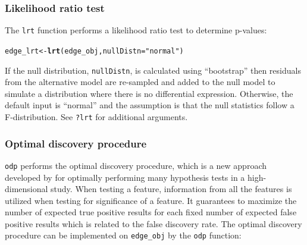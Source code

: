 \documentclass{article}\usepackage[]{graphicx}\usepackage[]{color}
\makeatletter
\newcommand{\hlstr}[1]{\textcolor[rgb]{0.192,0.494,0.8}{#1}}%
\newcommand{\hlstd}[1]{\textcolor[rgb]{0.345,0.345,0.345}{#1}}%
\newcommand{\hlkwb}[1]{\textcolor[rgb]{0.69,0.353,0.396}{#1}}%
\newcommand{\hlkwc}[1]{\textcolor[rgb]{0.333,0.667,0.333}{#1}}%
\newcommand{\hlkwd}[1]{\textcolor[rgb]{0.737,0.353,0.396}{\textbf{#1}}}%
\newenvironment{kframe}{%
 \def\at@end@of@kframe{}%
 \ifinner\ifhmode%
  \def\at@end@of@kframe{\end{minipage}}%
  \begin{minipage}{\columnwidth}%
 \fi\fi%
 \def\FrameCommand##1{\hskip\@totalleftmargin \hskip-\fboxsep
 \colorbox{shadecolor}{##1}\hskip-\fboxsep
     \hskip-\linewidth \hskip-\@totalleftmargin \hskip\columnwidth}%
 \MakeFramed {\advance\hsize-\width
   \@totalleftmargin\z@ \linewidth\hsize
   \@setminipage}}%
 {\par\unskip\endMakeFramed%
 \at@end@of@kframe}
\newenvironment{knitrout}{}{} %
\makeatother
\begin{document}
\subsubsection{Likelihood ratio test}
The {\tt lrt} function performs a likelihood ratio test to determine p-values:

\begin{knitrout}
\color{fgcolor}\begin{kframe}
\begin{alltt}
\hlstd{edge_lrt} \hlkwb{<-} \hlkwd{lrt}\hlstd{(edge_obj,} \hlkwc{nullDistn} \hlstd{=} \hlstr{"normal"}\hlstd{)}
\end{alltt}
\end{kframe}
\end{knitrout}
If the null distribution, {\tt nullDistn}, is calculated using ``bootstrap'' then residuals from the alternative model are re-sampled and added to the null model to simulate a distribution where there is no differential expression. Otherwise, the default input is ``normal'' and the assumption is that the null statistics follow a F-distribution. See {\tt ?lrt} for additional arguments.

\subsubsection{Optimal discovery procedure}
{\tt odp} performs the optimal discovery procedure, which is a new approach developed by \cite{storey:2005} for optimally performing many hypothesis tests in a high-dimensional study. When testing a feature, information from all the features is utilized when testing for significance of a feature. It guarantees to maximize the number of expected true positive results for each fixed number of expected false positive results which is related to the false discovery rate. The optimal discovery procedure can be implemented on {\tt edge\_obj} by the {\tt odp} function:
\end{document}
